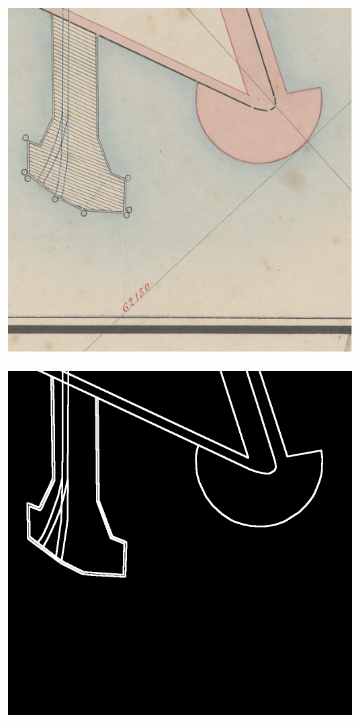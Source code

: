 \documentclass[12pt]{article}
\begin{document}
\begin{figure}[H]
 	\vspace{+2mm}
    \setcounter{subfigure}{0}
	
    \begin{subfigure}[b]{.28\textwidth}
		\begin{minipage}[t]{1\linewidth}
			\centering
			\includegraphics[width=1\linewidth]{images/patches/img8.png}
		\end{minipage}
	\end{subfigure}
	\begin{subfigure}[b]{.28\textwidth}
		\begin{minipage}[t]{1\linewidth}
			\centering
			\includegraphics[width=1\linewidth]{images/patches/gt8.png}

\end{minipage}
\end{subfigure}
\end{figure}
\end{document}
